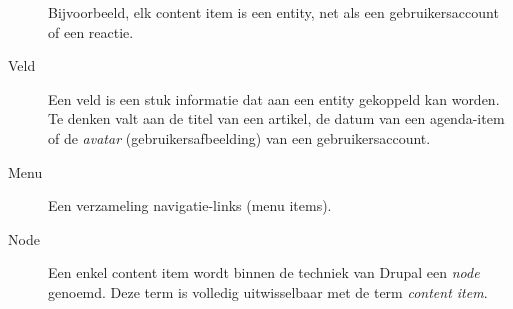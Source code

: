 \begin{description}
Bijvoorbeeld, elk content item is een entity, net als een gebruikersaccount of 
een reactie.
\item[Veld] Een veld is een stuk informatie dat aan een entity gekoppeld kan 
worden. Te denken valt aan de titel van een artikel, de datum van een 
agenda-item of de \emph{avatar} (gebruikersafbeelding) van een 
gebruikersaccount. 
\item[Menu] Een verzameling navigatie-links (menu items). 
\item[Node] Een enkel content item wordt binnen de techniek van Drupal een 
\emph{node} genoemd. Deze term is volledig uitwisselbaar met de term 
\emph{content item}. 
\end{description}
